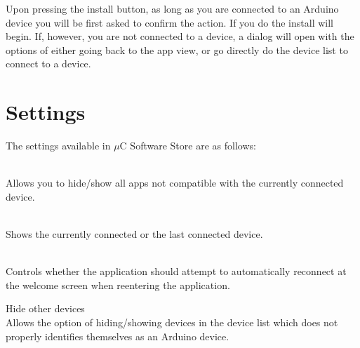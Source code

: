 Upon pressing the install button, as long as you are connected to an Arduino device you will be first asked to confirm the action. If you do the install will begin. If, however, you are not connected to a device, a dialog will open with the options of either going back to the app view, or go directly do the device list to connect to a device.

\chapter{Settings}
The settings available in $\mu$C Software Store are as follows:

\begin{description}
	\item[Hide/Show incompatible] \hfill \\
		Allows you to hide/show all apps not compatible with the currently connected device.
	\item[Connected device] \hfill \\
		Shows the currently connected or the last connected device. 
	\item[Automatically reconnect] \hfill \\
		 Controls whether the application should attempt to automatically reconnect at the welcome screen when reentering the application.
	\item{Hide other devices}\hfill \\
		Allows the option of hiding/showing devices in the device list which does not properly identifies themselves as an Arduino device. 
\end{description}
